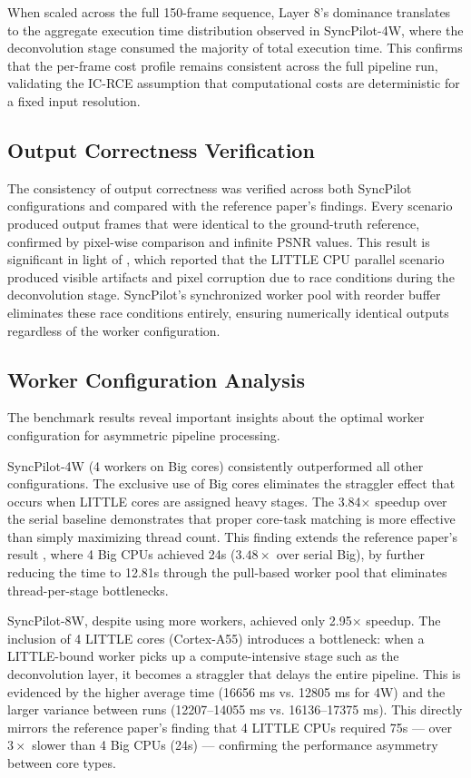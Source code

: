 \documentclass[conference]{IEEEtran}
\begin{document}
When scaled across the full 150-frame sequence, Layer 8's dominance translates to the aggregate execution time distribution observed in SyncPilot-4W, where the deconvolution stage consumed the majority of total execution time. This confirms that the per-frame cost profile remains consistent across the full pipeline run, validating the IC-RCE assumption that computational costs are deterministic for a fixed input resolution.

\subsection{Output Correctness Verification}
The consistency of output correctness was verified across both SyncPilot configurations and compared with the reference paper's findings. Every scenario produced output frames that were identical to the ground-truth reference, confirmed by pixel-wise comparison and infinite PSNR values. This result is significant in light of \cite{annisa2025fsrcnn}, which reported that the LITTLE CPU parallel scenario produced visible artifacts and pixel corruption due to race conditions during the deconvolution stage. SyncPilot's synchronized worker pool with reorder buffer eliminates these race conditions entirely, ensuring numerically identical outputs regardless of the worker configuration.

\subsection{Worker Configuration Analysis}
The benchmark results reveal important insights about the optimal worker configuration for asymmetric pipeline processing.

SyncPilot-4W (4 workers on Big cores) consistently outperformed all other configurations. The exclusive use of Big cores eliminates the straggler effect that occurs when LITTLE cores are assigned heavy stages. The 3.84$\times$ speedup over the serial baseline demonstrates that proper core-task matching is more effective than simply maximizing thread count. This finding extends the reference paper's result \cite{annisa2025fsrcnn}, where 4 Big CPUs achieved 24s ($3.48\times$ over serial Big), by further reducing the time to 12.81s through the pull-based worker pool that eliminates thread-per-stage bottlenecks.

SyncPilot-8W, despite using more workers, achieved only 2.95$\times$ speedup. The inclusion of 4 LITTLE cores (Cortex-A55) introduces a bottleneck: when a LITTLE-bound worker picks up a compute-intensive stage such as the deconvolution layer, it becomes a straggler that delays the entire pipeline. This is evidenced by the higher average time (16656 ms vs. 12805 ms for 4W) and the larger variance between runs (12207--14055 ms vs. 16136--17375 ms). This directly mirrors the reference paper's finding that 4 LITTLE CPUs required 75s --- over $3\times$ slower than 4 Big CPUs (24s) --- confirming the performance asymmetry between core types.
\end{document}
